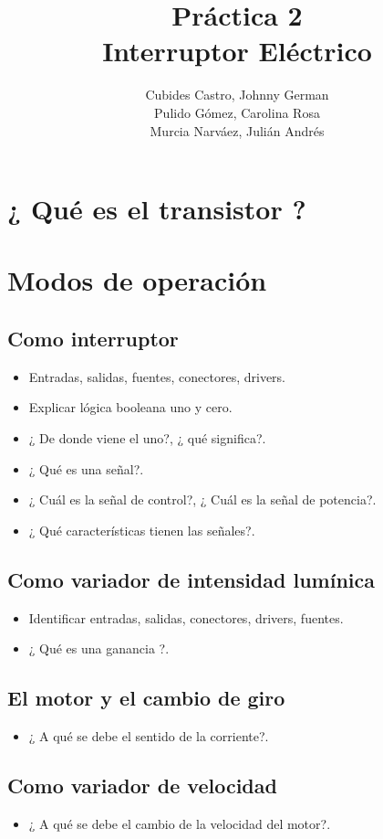 \documentclass{article}
\title{Práctica 2\\Interruptor Eléctrico}
\author{Cubides Castro, Johnny German \\
        Pulido Gómez, Carolina Rosa\\Murcia Narváez, Julián Andrés}
\begin{document}
\maketitle
\section{¿ Qué es el transistor ?}

\section{Modos de operación} 
\subsection{Como interruptor}
\begin{itemize}
\item Entradas, salidas, fuentes, conectores, drivers.
\item Explicar lógica booleana uno y cero.
\item ¿ De donde viene el uno?, ¿ qué significa?.
\item ¿ Qué es una señal?.
\item ¿ Cuál es la señal de control?, ¿ Cuál es la señal de potencia?. 
\item ¿ Qué características tienen las señales?.
\end{itemize}
\subsection{Como variador de intensidad lumínica}
\begin{itemize}
\item Identificar entradas, salidas, conectores, drivers, fuentes.
\item ¿ Qué es una ganancia ?.
\end{itemize}
\subsection{El motor y el cambio de giro}
\begin{itemize}
\item ¿ A qué se debe el sentido de la corriente?.
\end{itemize}
\subsection{Como variador de velocidad}
\begin{itemize}
\item ¿ A qué se debe el cambio de la velocidad del motor?.
\end{itemize}







%
\end{document}
